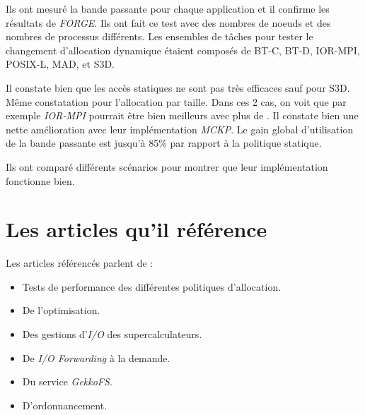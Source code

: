 \documentclass[10pt, a4paper]{article}
\begin{document}
Ils ont mesuré la bande passante pour chaque application et il confirme les résultats de \emph{FORGE}. Ils ont fait ce test avec des nombres de noeuds et des nombres de processus différents.
Les ensembles de tâches pour tester le changement d'allocation dynamique étaient composés de BT-C, BT-D, IOR-MPI, POSIX-L, MAD, et S3D.

Il constate bien que les accès statiques ne sont pas très efficaces sauf pour S3D. Même constatation pour l'allocation par taille. Dans ces 2 cas, on voit que par exemple \emph{IOR-MPI} pourrait être bien meilleurs avec plus de \noeudsIOforwarding{}. Il constate bien une nette amélioration avec leur implémentation \emph{MCKP}. Le gain global d'utilisation de la bande passante est jusqu'à 85\% par rapport à la politique statique.

Ils ont comparé différents scénarios pour montrer que leur implémentation fonctionne bien.

\section{Les articles qu'il référence}

Les articles référencés parlent de :
\begin{itemize}
  \item Tests de performance des différentes politiques d'allocation.
  \item De l'optimisation.
  \item Des gestions d'\emph{I/O} des supercalculateurs.
  \item De \emph{I/O Forwarding} à la demande.
  \item Du service \emph{GekkoFS}.
  \item D'ordonnancement.
\end{itemize}


\nocite{*}
\end{document}
